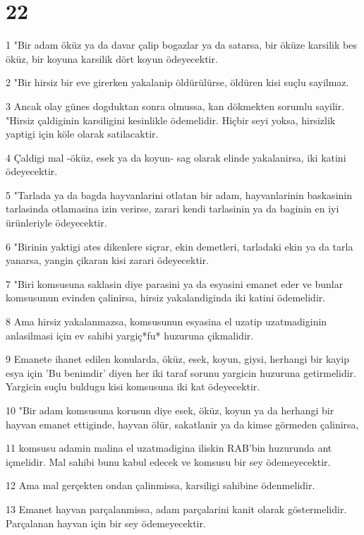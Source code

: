 \chapter{22}

\par 1 "Bir adam öküz ya da davar çalip bogazlar ya da satarsa, bir öküze karsilik bes öküz, bir koyuna karsilik dört koyun ödeyecektir.
\par 2 "Bir hirsiz bir eve girerken yakalanip öldürülürse, öldüren kisi suçlu sayilmaz.
\par 3 Ancak olay günes dogduktan sonra olmussa, kan dökmekten sorumlu sayilir. "Hirsiz çaldiginin karsiligini kesinlikle ödemelidir. Hiçbir seyi yoksa, hirsizlik yaptigi için köle olarak satilacaktir.
\par 4 Çaldigi mal -öküz, esek ya da koyun- sag olarak elinde yakalanirsa, iki katini ödeyecektir.
\par 5 "Tarlada ya da bagda hayvanlarini otlatan bir adam, hayvanlarinin baskasinin tarlasinda otlamasina izin verirse, zarari kendi tarlasinin ya da baginin en iyi ürünleriyle ödeyecektir.
\par 6 "Birinin yaktigi ates dikenlere siçrar, ekin demetleri, tarladaki ekin ya da tarla yanarsa, yangin çikaran kisi zarari ödeyecektir.
\par 7 "Biri komsusuna saklasin diye parasini ya da esyasini emanet eder ve bunlar komsusunun evinden çalinirsa, hirsiz yakalandiginda iki katini ödemelidir.
\par 8 Ama hirsiz yakalanmazsa, komsusunun esyasina el uzatip uzatmadiginin anlasilmasi için ev sahibi yargiç*fu* huzuruna çikmalidir.
\par 9 Emanete ihanet edilen konularda, öküz, esek, koyun, giysi, herhangi bir kayip esya için 'Bu benimdir' diyen her iki taraf sorunu yargicin huzuruna getirmelidir. Yargicin suçlu buldugu kisi komsusuna iki kat ödeyecektir.
\par 10 "Bir adam komsusuna korusun diye esek, öküz, koyun ya da herhangi bir hayvan emanet ettiginde, hayvan ölür, sakatlanir ya da kimse görmeden çalinirsa,
\par 11 komsusu adamin malina el uzatmadigina iliskin RAB'bin huzurunda ant içmelidir. Mal sahibi bunu kabul edecek ve komsusu bir sey ödemeyecektir.
\par 12 Ama mal gerçekten ondan çalinmissa, karsiligi sahibine ödenmelidir.
\par 13 Emanet hayvan parçalanmissa, adam parçalarini kanit olarak göstermelidir. Parçalanan hayvan için bir sey ödemeyecektir.
